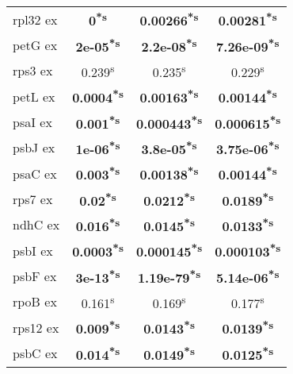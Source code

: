 \documentclass[a4paper]{article}
\begin{document}
\begin{longtable}{l|c|c|c}
rpl32 ex&\textbf{0\textsuperscript{*}\textsuperscript{s}}&\textbf{0.00266\textsuperscript{*}\textsuperscript{s}}&\textbf{0.00281\textsuperscript{*}\textsuperscript{s}}\\
petG ex&\textbf{2e-05\textsuperscript{*}\textsuperscript{s}}&\textbf{2.2e-08\textsuperscript{*}\textsuperscript{s}}&\textbf{7.26e-09\textsuperscript{*}\textsuperscript{s}}\\
rps3 ex&0.239\textsuperscript{s}&0.235\textsuperscript{s}&0.229\textsuperscript{s}\\
petL ex&\textbf{0.0004\textsuperscript{*}\textsuperscript{s}}&\textbf{0.00163\textsuperscript{*}\textsuperscript{s}}&\textbf{0.00144\textsuperscript{*}\textsuperscript{s}}\\
psaI ex&\textbf{0.001\textsuperscript{*}\textsuperscript{s}}&\textbf{0.000443\textsuperscript{*}\textsuperscript{s}}&\textbf{0.000615\textsuperscript{*}\textsuperscript{s}}\\
psbJ ex&\textbf{1e-06\textsuperscript{*}\textsuperscript{s}}&\textbf{3.8e-05\textsuperscript{*}\textsuperscript{s}}&\textbf{3.75e-06\textsuperscript{*}\textsuperscript{s}}\\
psaC ex&\textbf{0.003\textsuperscript{*}\textsuperscript{s}}&\textbf{0.00138\textsuperscript{*}\textsuperscript{s}}&\textbf{0.00144\textsuperscript{*}\textsuperscript{s}}\\
rps7 ex&\textbf{0.02\textsuperscript{*}\textsuperscript{s}}&\textbf{0.0212\textsuperscript{*}\textsuperscript{s}}&\textbf{0.0189\textsuperscript{*}\textsuperscript{s}}\\
ndhC ex&\textbf{0.016\textsuperscript{*}\textsuperscript{s}}&\textbf{0.0145\textsuperscript{*}\textsuperscript{s}}&\textbf{0.0133\textsuperscript{*}\textsuperscript{s}}\\
psbI ex&\textbf{0.0003\textsuperscript{*}\textsuperscript{s}}&\textbf{0.000145\textsuperscript{*}\textsuperscript{s}}&\textbf{0.000103\textsuperscript{*}\textsuperscript{s}}\\
psbF ex&\textbf{3e-13\textsuperscript{*}\textsuperscript{s}}&\textbf{1.19e-79\textsuperscript{*}\textsuperscript{s}}&\textbf{5.14e-06\textsuperscript{*}\textsuperscript{s}}\\
rpoB ex&0.161\textsuperscript{s}&0.169\textsuperscript{s}&0.177\textsuperscript{s}\\
rps12 ex&\textbf{0.009\textsuperscript{*}\textsuperscript{s}}&\textbf{0.0143\textsuperscript{*}\textsuperscript{s}}&\textbf{0.0139\textsuperscript{*}\textsuperscript{s}}\\
psbC ex&\textbf{0.014\textsuperscript{*}\textsuperscript{s}}&\textbf{0.0149\textsuperscript{*}\textsuperscript{s}}&\textbf{0.0125\textsuperscript{*}\textsuperscript{s}}\\

\end{longtable}
\end{document}
